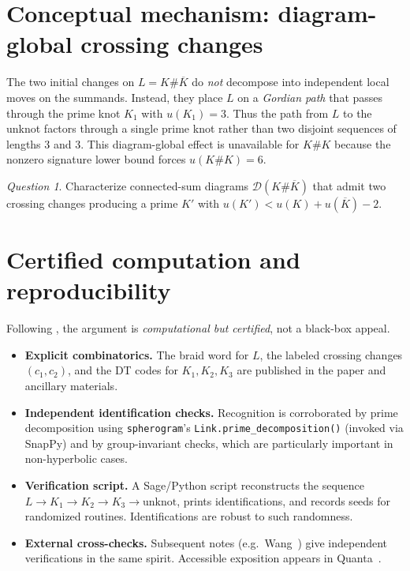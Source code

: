 \documentclass[11pt]{article}
\theoremstyle{plain}
\theoremstyle{remark}
\newtheorem{question}{Question}
\newcommand{\Kone}{K_1}
\newcommand{\Ktwo}{K_2}
\newcommand{\Kthree}{K_3}
\begin{document}
\section{Conceptual mechanism: diagram-global crossing changes}
The two initial changes on \(L=K\#\overline K\) do \emph{not} decompose into independent local moves on the summands.
Instead, they place \(L\) on a \emph{Gordian path} that passes through the prime knot \(\Kone\) with \(u(\Kone)=3\).
Thus the path from \(L\) to the unknot factors through a single prime knot rather than two disjoint sequences of lengths \(3\) and \(3\).
This diagram-global effect is unavailable for \(K\#K\) because the nonzero signature lower bound forces \(u(K\#K)=6\).

\begin{question}
Characterize connected-sum diagrams \(\mathcal D(K\#\overline K)\) that admit two crossing changes producing a prime \(K'\) with \(u(K')<u(K)+u(\overline K)-2\).
\end{question}

\section{Certified computation and reproducibility}
Following \cite{BH25}, the argument is \emph{computational but certified}, not a black-box appeal.

\begin{itemize}[leftmargin=2em]
\item \textbf{Explicit combinatorics.}
The braid word for \(L\), the labeled crossing changes \((c_1,c_2)\), and the DT codes for \(\Kone,\Ktwo,\Kthree\) are published in the paper and ancillary materials.

\item \textbf{Independent identification checks.}
Recognition is corroborated by prime decomposition using \texttt{spherogram}’s \texttt{Link.prime\_decomposition()} (invoked via SnapPy) and by group-invariant checks, which are particularly important in non-hyperbolic cases.

\item \textbf{Verification script.}
A Sage/Python script reconstructs the sequence
\(L \to \Kone \to \Ktwo \to \Kthree \to \text{unknot}\),
prints identifications, and records seeds for randomized routines. Identifications are robust to such randomness.

\item \textbf{External cross-checks.}
Subsequent notes (e.g.\ Wang~\cite{Wang2025}) give independent verifications in the same spirit. Accessible exposition appears in Quanta~\cite{Quanta2025}.
\end{itemize}
\end{document}
